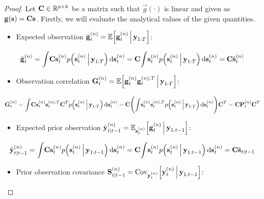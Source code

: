 	\begin{proof}
		Let \( \mat{C} \in \R^{p \times k} \) be a matrix such that \( \vec{g}(\cdot) \) is linear and given as \( \vec{g}(\vec{s}) = \mat{C} \vec{s} \). Firstly, we will evaluate the analytical values of the given quantities.
		\begin{itemize}
			\item Expected observation \( \hat{\vec{g}}_t^{(n)} = \E\Big[\vec{g}_t^{(n)} \Biggiven \vec{y}_{1:T}\Big] \):
		\end{itemize}
		\begin{align*}
			\hat{\vec{g}}_t^{(n)}
				= \int\! \mat{C} \vec{s}_t^{(n)} p\Big( \vec{s}_t^{(n)} \Biggiven \vec{y}_{1:T} \Big) \dd{\vec{s}_t^{(n)}}
				= \mat{C} \! \int\! \vec{s}_t^{(n)} p\Big( \vec{s}_t^{(n)} \Biggiven \vec{y}_{1:T} \Big) \dd{\vec{s}_t^{(n)}}
				= \mat{C} \hat{\vec{s}}_{t}^{(n)}
		\end{align*}
		\begin{itemize}
			\item Observation correlation \( \mat{G}_t^{(n)} = \E\Big[\vec{g}_t^{(n)} \vec{g}_t^{(n), T} \Biggiven \vec{y}_{1:T}\Big] \):
		\end{itemize}
		\begin{align*}
			\mat{G}_t^{(n)}
				= \int\! \mat{C} \vec{s}_t^{(n)} \vec{s}_t^{(n), T} \mat{C}^T p\Big( \vec{s}_t^{(n)} \Biggiven \vec{y}_{1:T} \Big) \dd{\vec{s}_t^{(n)}}
				= \mat{C} \Bigg(\! \int\! \vec{s}_t^{(n)} \vec{s}_t^{(n), T} p\Big( \vec{s}_t^{(n)} \Biggiven \vec{y}_{1:T} \Big) \dd{\vec{s}_t^{(n)}} \!\Bigg) \mat{C}^T
				= \mat{C} \mat{P}_t^{(n)} \mat{C}^T
		\end{align*}
		\begin{itemize}
			\item Expected prior observation \( \hat{\vec{y}}_{t \subgiven t - 1}^{(n)} = \E_{\vec{s}_t^{(n)}}\Big[\vec{g}_t^{(n)} \Biggiven \vec{y}_{1:t - 1}\Big] \):
		\end{itemize}
		\begin{align*}
			\hat{\vec{y}}_{t \subgiven t - 1}^{(n)}
				= \int\! \mat{C} \vec{s}_t^{(n)} p\Big(\vec{s}_t^{(n)} \Biggiven \vec{y}_{1:t - 1}\Big) \dd{\vec{s}_t^{(n)}}
				= \mat{C} \! \int\! \vec{s}_t^{(n)} p\Big(\vec{s}_t^{(n)} \Biggiven \vec{y}_{1:t - 1}\Big) \dd{\vec{s}_t^{(n)}}
				= \mat{C} \hat{\vec{s}}_{t \subgiven t - 1}
		\end{align*}
		\begin{itemize}
			\item Prior observation covariance \( \mat{S}_{t \subgiven t - 1}^{(n)} = \Cov_{\vec{y}_t^{(n)}}\!\Big[\vec{y}_t^{(n)} \Biggiven \vec{y}_{1:t - 1}\Big] \):

\end{itemize}
\end{proof}

